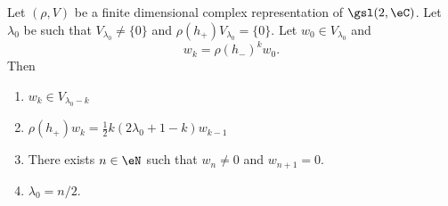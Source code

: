 \begin{proposition}      \label{PROPooZCAOooHHGxQk}
    Let \( (\rho, V)\) be a finite dimensional complex representation of \( \gsl(2,\eC)\). Let \( \lambda_0\) be such that \( V_{\lambda_0}\neq \{ 0 \}\) and \( \rho(h_+)V_{\lambda_0}=\{ 0 \}\). Let \( w_0\in V_{\lambda_0}\) and 
    \begin{equation}
        w_k=\rho(h_-)^kw_0.
    \end{equation}
    Then
    \begin{enumerate}
        \item       \label{ITEMooBPPFooKdGyqO}
            \( w_k\in V_{\lambda_0-k}\)
        \item       \label{ITEMooHNULooHoTgEa}
                    \( \rho(h_+)w_k=\frac{ 1 }{2}k(2\lambda_0+1-k)w_{k-1}\)
                \item       \label{ITEMooHDAPooClASpy}
                    There exists \( n\in \eN\) such that \( w_n\neq 0\) and \( w_{n+1}=0\).
                \item       \label{ITEMooJBZFooGqallS}
                    \( \lambda_0=n/2\).
    \end{enumerate}
\end{proposition}


